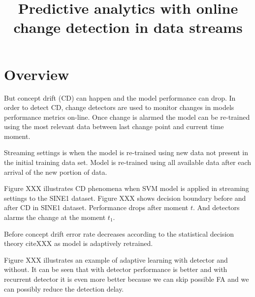 \documentclass[12 pt]{article}
\title{Predictive analytics with online change detection in data streams}
\date{}
\begin{document}
	\maketitle
  \section{Overview}
  But concept drift (CD) can happen and the model performance can drop. In
  order to detect CD, change detectors are used to monitor changes in models
  performance metrics on-line. Once change is alarmed the model can be
  re-trained using the most relevant data between last change point and current
  time moment.

  Streaming settings is when the model is re-trained using new data not present
  in the initial training data set. Model is re-trained using all available
  data after each arrival of the new portion of data.  

  Figure XXX illustrates CD phenomena when SVM model is applied in streaming
  settings to the SINE1 dataset. Figure XXX shows decision boundary before and
  after CD in SINE1 dataset. Performance drops after moment $t$. And detectors
  alarms the change at the moment $t_1$.
  
  Before concept drift error rate decreases according to the statistical
  decision theory cite{XXX} as model is adaptively retrained.

  Figure XXX illustrates an example of adaptive learning with detector and
  without. It can be seen that with detector performance is better and with
  recurrent detector it is even more better because we can skip possible FA and
  we can possibly reduce the detection delay.
\end{document}
